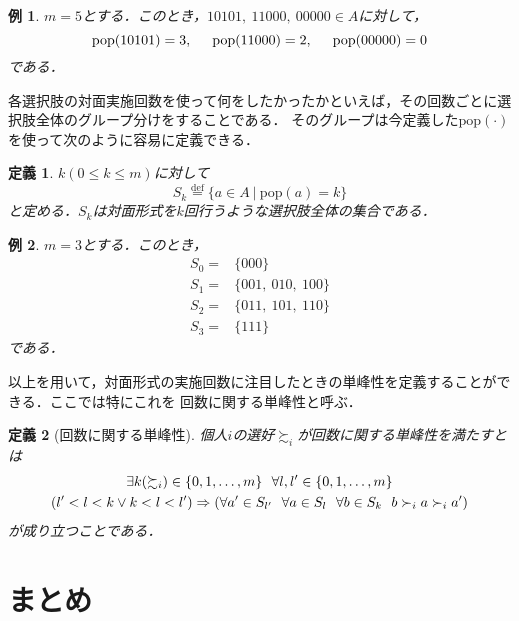 \documentclass[dvipdfmx]{jsarticle}
\newtheorem{definition}{定義}
\newtheorem{example}{例}
\begin{document}
  \begin{example}
    $m=5$とする．このとき，$10101,\ 11000,\ 00000 \in A$に対して，
    \[
      \mathrm{pop}(10101) = 3, \hspace{5mm} \mathrm{pop}(11000) = 2, \hspace{5mm} \mathrm{pop}(00000) = 0
    \]
    である．
  \end{example}

  各選択肢の対面実施回数を使って何をしたかったかといえば，その回数ごとに選択肢全体のグループ分けをすることである．
  そのグループは今定義した$\mathrm{pop(\cdot)}$を使って次のように容易に定義できる．

  \begin{definition}
    $k(0 \leq k \leq m)$に対して
    \[
      S_k \stackrel{\mathrm{def}}{=} \{a \in A\ | \ \mathrm{pop}(a) = k \}
    \]
    と定める．$S_k$は対面形式を$k$回行うような選択肢全体の集合である．
  \end{definition}

  \begin{example}
    $m = 3$とする．このとき，
    \begin{align*}
      S_0 =& \{ 000 \} \\
      S_1 =& \{ 001,\ 010,\ 100 \} \\
      S_2 =& \{ 011,\ 101,\ 110 \} \\
      S_3 =& \{ 111 \}
    \end{align*}
    である．
  \end{example}

  以上を用いて，対面形式の実施回数に注目したときの単峰性を定義することができる．ここでは特にこれを
  回数に関する単峰性と呼ぶ．
  \begin{definition}[回数に関する単峰性]
    個人$i$の選好$\succsim_i$が回数に関する単峰性を満たすとは
    \begin{multline*}
      \exists k(\succsim_i) \in \{0, 1, \ldots, m\} \ \ \forall \mathnormal{l},\mathnormal{l}' \in \{0, 1, \ldots, m\} \\
      (\mathnormal{l}' < \mathnormal{l} < k \vee k < \mathnormal{l} < \mathnormal{l}') \Rightarrow
      (\forall a' \in S_{\mathnormal{l}'} \ \ \forall a \in S_{\mathnormal{l}} \ \ \forall b \in S_k
      \ \ b \succ_i a \succ_i a')
    \end{multline*}
    が成り立つことである．
  \end{definition}
\section{まとめ}
\end{document}
